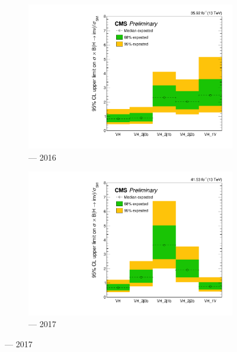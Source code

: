 \begin{figure}[htbp]
    \centering
    \begin{subfigure}[b]{0.45\textwidth}
        \includegraphics[width=\textwidth]{figures/limits/VH/limit_2016_VH_Scenario5.pdf}
        \caption{\VH --- 2016}
    \end{subfigure}
    \hfill
    \begin{subfigure}[b]{0.45\textwidth}
        \includegraphics[width=\textwidth]{figures/limits/VH/limit_2017_VH_Scenario5.pdf}
        \caption{\VH --- 2017}
    \end{subfigure}


\end{figure}
